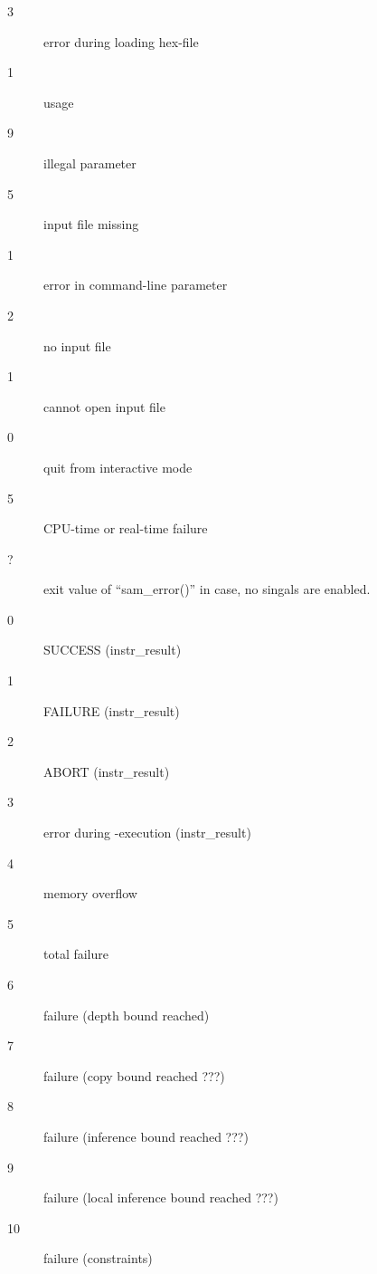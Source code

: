 \begin{description}
\item[3]
	error during loading hex-file
\item[1]
	usage
\item[9]
	illegal parameter
\item[5]
	input file missing
\item[1]
	error in command-line parameter
\item[2]
	no input file
\item[1]
	cannot open input file
\item[0]
	quit from interactive mode
\item[5]
	CPU-time or real-time failure
\item[?]
	exit value of ``sam\_error()'' in case, no singals are enabled.
\item[0]
	SUCCESS (instr\_result)
\item[1]
	FAILURE (instr\_result)
\item[2]
	ABORT (instr\_result)
\item[3]
	error during \SAM-execution (instr\_result)
\item[4]
	memory overflow
\item[5]
	total failure
\item[6]
	failure (depth bound reached)
\item[7]
	failure (copy bound reached ???)
\item[8]
	failure (inference bound reached ???)
\item[9]
	failure (local inference bound reached ???)
\item[10]
	failure (constraints)
\end{description}

